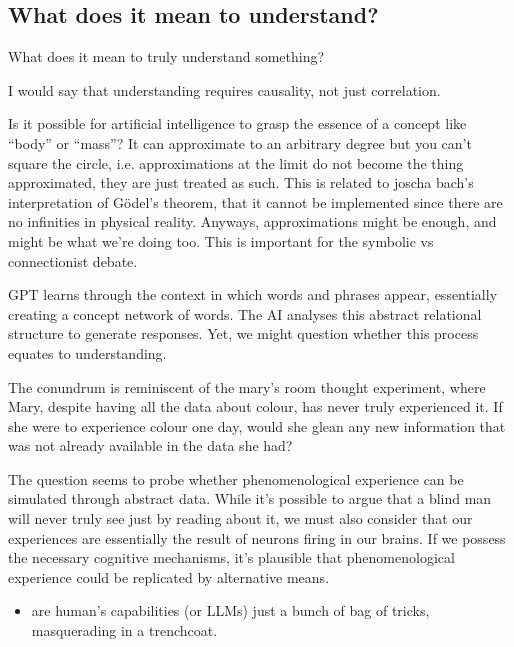 \subsection{What does it mean to understand?}
What does it mean to truly understand something? 

I would say that understanding requires causality, not just correlation. 

Is it possible for artificial intelligence to grasp the essence of a concept like “body” or “mass”? It can approximate to an arbitrary degree but you can't square the circle, i.e. approximations at the limit do not become the thing approximated, they are just treated as such. This is related to joscha bach's interpretation of Gödel's theorem, that it cannot be implemented since there are no infinities in physical reality. Anyways, approximations might be enough, and might be what we're doing too. This is important for the symbolic vs connectionist debate.

GPT learns through the context in which words and phrases appear, essentially creating a concept network of words. The AI analyses this abstract relational structure to generate responses. Yet, we might question whether this process equates to understanding.

The conundrum is reminiscent of the mary's room thought experiment, where Mary, despite having all the data about colour, has never truly experienced it. If she were to experience colour one day, would she glean any new information that was not already available in the data she had?

The question seems to probe whether phenomenological experience can be simulated through abstract data. While it's possible to argue that a blind man will never truly see just by reading about it, we must also consider that our experiences are essentially the result of neurons firing in our brains. If we possess the necessary cognitive mechanisms, it's plausible that phenomenological experience could be replicated by alternative means.


\begin{itemize}
    \item are human's capabilities (or LLMs) just a bunch of bag of tricks, masquerading in a trenchcoat.
\end{itemize}

